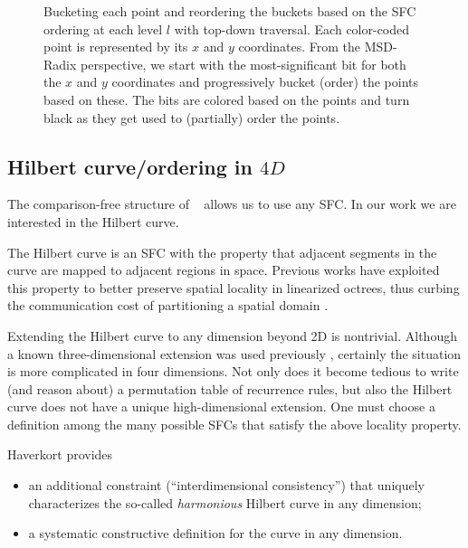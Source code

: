 \begin{figure}
\begin{tikzpicture}[scale=0.2,every node/.style={scale=0.6}]
%	
	
	\end{tikzpicture}
	\caption{\label{fig:tsort} Bucketing each point and reordering the buckets based on the SFC ordering at each level $l$ with top-down traversal. Each color-coded point is represented by its $x$ and $y$ coordinates. From the MSD-Radix perspective, we start with the most-significant bit for both the $x$ and $y$ coordinates and progressively bucket (order) the points based on these. The bits are colored based on the points and turn black as they get used to (partially) order the points.}
\end{figure}

\subsection{Hilbert curve/ordering in $4D$}
\label{subsec:hilbert4d}
The comparison-free structure of \tsort~ allows us to use any SFC. In our work we are interested in the Hilbert curve.

The Hilbert curve is an SFC with the property that adjacent segments in the curve are mapped to adjacent regions in space. Previous works have exploited this property to better preserve spatial locality in linearized octrees, thus curbing the communication cost of partitioning a spatial domain \cite{FernandoSundar16}.

Extending the Hilbert curve to any dimension beyond 2D is nontrivial. Although a known three-dimensional extension was used previously \cite{FernandoSundar16}, certainly the situation is more complicated in four dimensions. Not only does it become tedious to write (and reason about) a permutation table of recurrence rules, but also the Hilbert curve does not have a unique high-dimensional extension. One must choose a definition among the many possible SFCs that satisfy the above locality property.

Haverkort \cite{haverkort2012harmonious} provides
\begin{itemize}
  \item an additional constraint (``interdimensional consistency'') that uniquely characterizes the so-called \textit{harmonious} Hilbert curve in any dimension;
  \item a systematic constructive definition for the curve in any dimension.
\end{itemize}

